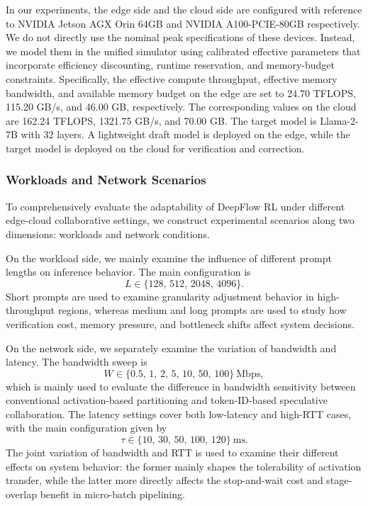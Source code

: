 \documentclass[a4paper,fleqn]{cas-dc}
\begin{document}
In our experiments, the edge side and the cloud side are configured with reference to NVIDIA Jetson AGX Orin 64GB and NVIDIA A100-PCIE-80GB respectively. We do not directly use the nominal peak specifications of these devices. Instead, we model them in the unified simulator using calibrated effective parameters that incorporate efficiency discounting, runtime reservation, and memory-budget constraints. Specifically, the effective compute throughput, effective memory bandwidth, and available memory budget on the edge are set to 24.70 TFLOPS, 115.20 GB/s, and 46.00 GB, respectively. The corresponding values on the cloud are 162.24 TFLOPS, 1321.75 GB/s, and 70.00 GB. The target model is Llama-2-7B with 32 layers. A lightweight draft model is deployed on the edge, while the target model is deployed on the cloud for verification and correction.

\subsubsection{Workloads and Network Scenarios}

To comprehensively evaluate the adaptability of DeepFlow RL under different edge-cloud collaborative settings, we construct experimental scenarios along two dimensions: workloads and network conditions.

On the workload side, we mainly examine the influence of different prompt lengths on inference behavior. The main configuration is
\begin{equation}
L \in \{128,\,512,\,2048,\,4096\}.
\end{equation}
Short prompts are used to examine granularity adjustment behavior in high-throughput regions, whereas medium and long prompts are used to study how verification cost, memory pressure, and bottleneck shifts affect system decisions.

On the network side, we separately examine the variation of bandwidth and latency. The bandwidth sweep is
\begin{equation}
W \in \{0.5,\,1,\,2,\,5,\,10,\,50,\,100\}\ \text{Mbps},
\end{equation}
which is mainly used to evaluate the difference in bandwidth sensitivity between conventional activation-based partitioning and token-ID-based speculative collaboration. The latency settings cover both low-latency and high-RTT cases, with the main configuration given by
\begin{equation}
\tau \in \{10,\,30,\,50,\,100,\,120\}\ \text{ms}.
\end{equation}
The joint variation of bandwidth and RTT is used to examine their different effects on system behavior: the former mainly shapes the tolerability of activation transfer, while the latter more directly affects the stop-and-wait cost and stage-overlap benefit in micro-batch pipelining.
\end{document}
